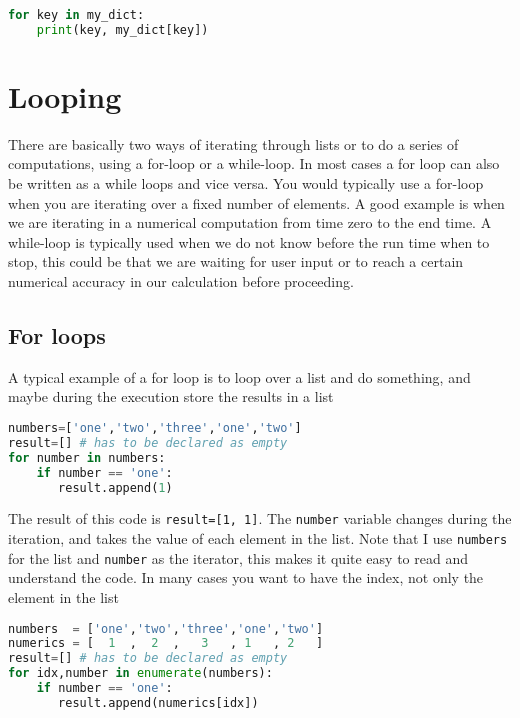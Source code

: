 \documentclass[graybox,sectrefs,envcountresetchap,open=right,final]{svmonodo}
\begin{document}
\begin{lstlisting}[language=python,style=blue1bar]
for key in my_dict:
    print(key, my_dict[key])

\end{lstlisting}


\section{Looping}
There are basically two ways of iterating through lists or to do a series of computations, using a for-loop or a while-loop. In most cases a for loop can also be written as a while loops and vice versa. You would typically use a for-loop when you are iterating over a fixed number of elements. A good example is when we are iterating in a numerical computation from time zero to the end time. A while-loop is typically used when we do not know before the run time when to stop, this could be that we are waiting for user input or to reach a certain numerical accuracy in our calculation before proceeding.

\subsection{For loops}
A typical example of a for loop is to loop over a list and do something, and maybe during the execution store the results in a list






\begin{lstlisting}[language=python,style=blue1bar]
numbers=['one','two','three','one','two']
result=[] # has to be declared as empty
for number in numbers:
    if number == 'one':
       result.append(1) 

\end{lstlisting}

The result of this code is \texttt{result=[1, 1]}. The \texttt{number} variable changes during the iteration, and takes the value of each element in the list. Note that I use \texttt{numbers} for the list and \texttt{number} as the iterator, this makes it quite easy to read and understand the code. In many cases you want to have the index, not only the element in the list







\begin{lstlisting}[language=python,style=blue1bar]
numbers  = ['one','two','three','one','two']
numerics = [  1  ,  2  ,   3   , 1   , 2   ]
result=[] # has to be declared as empty
for idx,number in enumerate(numbers):
    if number == 'one':
       result.append(numerics[idx]) 

\end{lstlisting}
\end{document}
